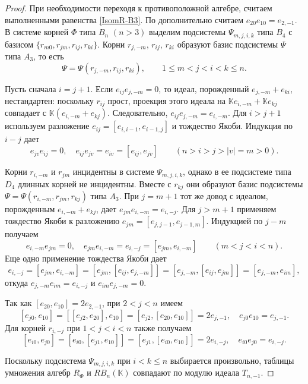 \documentclass[a4paper,14pt,oneside,openany]{memoir}
\begin{document}
\begin{proof}
    При необходимости переходя к противоположной алгебре, считаем выполненными
    равенства \eqref{IsomR-B3}. По  дополнительно считаем
    $e_{20}e_{10}=e_{2,-1}$. В системе корней ${\Phi}$ типа $B_n$ $(n>3)$ выделим
    подсистемы $\Psi_{m,j,i,k}$ типа $B_4$ с базисом $\{r_{m0}, r_{jm}, r_{ij},
    r_{ki}\}$. Корни $r_{j,-m}$, $r_{ij}$, $r_{ki}$ образуют базис подсистемы
    $\Psi$ типа $A_3$, то есть
    \[
        \Psi=\Psi(r_{j,-m},r_{ij},r_{ki}),\qquad 1\leq m<j<i<k\leq n.
    \]

    Пусть сначала $i=j+1$. Если $e_{ij}e_{j,-m}=0$, то идеал, порожденный
    $e_{j,-m}+e_{ki}$, нестандартен: поскольку $r_{ij}$ прост, проекция этого
    идеала на $\mathbb{K}e_{i,-m}+\mathbb{K}e_{kj}$ совпадает с
    $\mathbb{K}(e_{i,-m}+e_{kj})$. Следовательно, $e_{ij}e_{j,-m}=e_{i,-m}$. Для
    $i>j+1$ используем разложение $e_{ij}=[e_{i,i-1},e_{i-1,j}]$ и тождество Якоби.
    Индукция по $i-j$ дает
    \[
        e_{jv}e_{ij}=0,\quad e_{ij}e_{jv}=e_{iv}=[e_{ij},e_{jv}]
        \qquad(n>i>j>|v|=m>0).
    \]

    Корни $r_{i,-m}$ и $r_{jm}$ инцидентны в системе $\Psi_{m,j,i,k}$, однако в ее
    подсистеме типа $D_4$ длинных корней не инцидентны. Вместе с $r_{kj}$ они
    образуют базис подсистемы $\Psi=\Psi(r_{i,-m},r_{jm},r_{kj})$ типа $A_3$. При
    $j=m+1$ тот же довод с идеалом, порожденным $e_{i,-m}+e_{kj}$, дает
    $e_{jm}e_{i,-m}=e_{i,-j}$. Для $j>m+1$ применяем тождество Якоби к разложению
    $e_{jm}=[e_{j,j-1},e_{j-1,m}]$. Индукцией по $j-m$ получаем
    \[
        e_{i,-m}e_{jm}=0,\quad e_{jm}e_{i,-m}=e_{i,-j}=[e_{jm},e_{i,-m}]
        \qquad(m<j<i<n).
    \]
    Еще одно применение тождества Якоби дает
    \[
        e_{i,-j}=[e_{jm},e_{i,-m}]=[e_{jm},[e_{ij},e_{j,-m}]]
        =[e_{j,-m},[e_{ij},e_{jm}]]=[e_{j,-m},e_{im}],
    \]
    откуда $e_{j,-m}e_{im}=e_{i,-j}$ и $e_{im}e_{j,-m}=0$.

    Так как $[e_{20},e_{10}]=2e_{2,-1}$, при $2<j<n$ имеем
    \[
        [e_{j0},e_{10}]=[[e_{j2},e_{20}],e_{10}]
        =[e_{j2},[e_{20},e_{10}]]=2e_{j,-1},\quad e_{j0}e_{10}=e_{j,-1}.
    \]
    Для корней $r_{i,-j}$ при $1<j<i<n$ также получаем
    \[
        [e_{i0},e_{j0}]=[e_{i0},[e_{j1},e_{10}]]
        =[e_{j1},[e_{i0},e_{10}]]=2e_{i,-j},\quad e_{i0}e_{j0}=e_{i,-j}.
    \]

    Поскольку подсистема $\Psi_{m,j,i,k}$ при $i<k\leq n$ выбирается произвольно,
    таблицы умножения алгебр $R_\Phi$ и $RB_n(\mathbb{K})$ совпадают по модулю
    идеала $T_{n,-1}$.
\end{proof}
\end{document}
